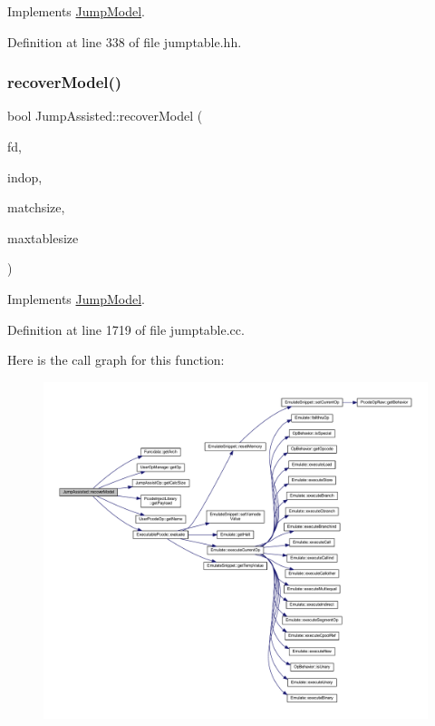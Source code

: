 Implements \mbox{\hyperlink{class_jump_model_af54c70c0bcedfcf45ed1ce6895d9e2db}{Jump\+Model}}.



Definition at line 338 of file jumptable.\+hh.

\mbox{\label{class_jump_assisted_a54a3d21e91b75d420340cd403a53fc63}} 
\subsubsection{\texorpdfstring{recoverModel()}{recoverModel()}}
{\footnotesize\ttfamily bool Jump\+Assisted\+::recover\+Model (\begin{DoxyParamCaption}\item[{\mbox{\hyperlink{class_funcdata}{Funcdata}} $\ast$}]{fd,  }\item[{\mbox{\hyperlink{class_pcode_op}{Pcode\+Op}} $\ast$}]{indop,  }\item[{uint4}]{matchsize,  }\item[{uint4}]{maxtablesize }\end{DoxyParamCaption})\hspace{0.3cm}{\ttfamily [virtual]}}



Implements \mbox{\hyperlink{class_jump_model_a9c2326278dd18c9d78dd5cd5795e802b}{Jump\+Model}}.



Definition at line 1719 of file jumptable.\+cc.

Here is the call graph for this function\+:
\nopagebreak
\begin{figure}[H]
\begin{center}
\leavevmode
\includegraphics[width=350pt]{class_jump_assisted_a54a3d21e91b75d420340cd403a53fc63_cgraph}
\end{center}
\end{figure}
\mbox{\label{class_jump_assisted_acda2c7e13c4b78b8c229e63fad03374b}} 
